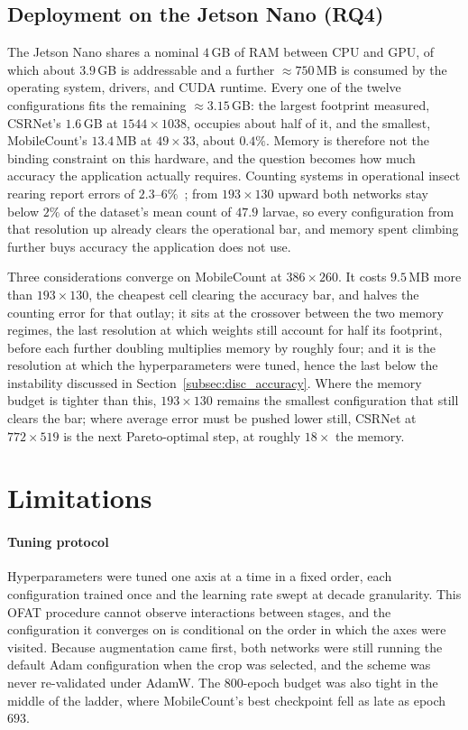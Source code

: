 \documentclass[conference]{IEEEtran}
\begin{document}
\subsection{Deployment on the Jetson Nano (RQ4)}
\label{subsec:disc_deployment}

The Jetson Nano shares a nominal $4$\,GB of RAM between CPU and GPU, of which
about $3.9$\,GB is addressable and a further ${\approx}750$\,MB is consumed by
the operating system, drivers, and CUDA runtime. Every one of the twelve
configurations fits the remaining ${\approx}3.15$\,GB: the
largest footprint measured, CSRNet's $1.6$\,GB at $1544\times1038$, occupies
about half of it, and the smallest, MobileCount's $13.4$\,MB at $49\times33$,
about $0.4\%$. Memory is therefore not the binding constraint on this hardware,
and the question becomes how much accuracy the application actually requires.
Counting systems in operational insect rearing report errors of
$2.3$--$6\%$~\cite{mamai2019, benedict2020}; from $193\times130$ upward both
networks stay below $2\%$ of the dataset's mean count of $47.9$ larvae, so every
configuration from that resolution up already clears the operational bar, and
memory spent climbing further buys accuracy the application does not use.

Three considerations converge on MobileCount at $386\times260$. It costs
$9.5$\,MB more than $193\times130$, the cheapest cell clearing the accuracy bar,
and halves the counting error for that outlay; it sits at the crossover between the two memory regimes, the last resolution at which weights still account for half its footprint, before each further doubling multiplies memory by roughly four; and
it is the resolution at which the hyperparameters were tuned, hence the last
below the instability discussed in Section~\ref{subsec:disc_accuracy}. Where the memory budget is tighter than this,
$193\times130$ remains the smallest configuration that still clears the bar;
where average error must be pushed lower still, CSRNet at $772\times519$ is the
next Pareto-optimal step, at roughly $18\times$ the memory.

\section{Limitations}
\label{sec:limitations}

\paragraph{Tuning protocol}
Hyperparameters were tuned one axis at a time in a fixed order, each
configuration trained once and the learning rate swept at decade granularity.
This OFAT procedure cannot observe interactions between stages, and the
configuration it converges on is conditional on the order in which the axes were
visited. Because augmentation came first, both networks were still running the
default Adam configuration when the crop was selected, and the scheme was never
re-validated under AdamW. The $800$-epoch budget was also tight in the middle of
the ladder, where MobileCount's best checkpoint fell as late as epoch $693$.
\end{document}
